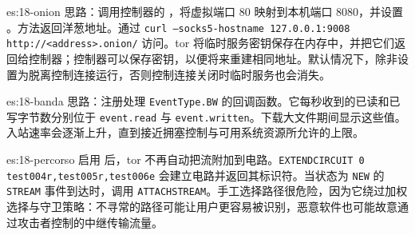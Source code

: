 \begin{soluzione}{es:18-onion}
思路：调用控制器的 ，将虚拟端口 80 映射到本机端口 8080，并设置 。方法返回洋葱地址。通过 \texttt{curl --socks5-hostname 127.0.0.1:9008 http://<address>.onion/} 访问。tor 将临时服务密钥保存在内存中，并把它们返回给控制器；控制器可以保存密钥，以便将来重建相同地址。默认情况下，除非设置为脱离控制连接运行，否则控制连接关闭时临时服务也会消失。
\end{soluzione}

\begin{soluzione}{es:18-banda}
思路：注册处理 \texttt{EventType.BW} 的回调函数。它每秒收到的已读和已写字节数分别位于 \texttt{event.read} 与 \texttt{event.written}。下载大文件期间显示这些值。入站速率会逐渐上升，直到接近拥塞控制与可用系统资源所允许的上限。
\end{soluzione}

\begin{soluzione}{es:18-percorso}
启用  后，tor 不再自动把流附加到电路。\texttt{EXTENDCIRCUIT 0 test004r,test005r,test006e} 会建立电路并返回其标识符。当状态为 \texttt{NEW} 的 \texttt{STREAM} 事件到达时，调用 \texttt{ATTACHSTREAM}。手工选择路径很危险，因为它绕过加权选择与守卫策略：不寻常的路径可能让用户更容易被识别，恶意软件也可能故意通过攻击者控制的中继传输流量。
\end{soluzione}
